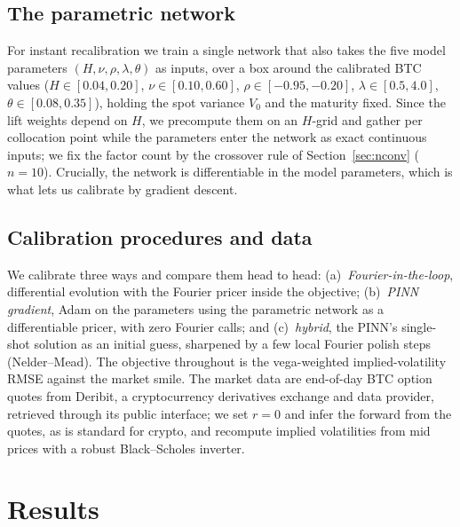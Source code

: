 \documentclass[11pt]{article}
\begin{document}
\subsection{The parametric network}
For instant recalibration we train a single network that also takes the five model
parameters $(H,\nu,\rho,\lambda,\theta)$ as inputs, over a box around the
calibrated BTC values ($H\in[0.04,0.20]$, $\nu\in[0.10,0.60]$,
$\rho\in[-0.95,-0.20]$, $\lambda\in[0.5,4.0]$, $\theta\in[0.08,0.35]$), holding the
spot variance $V_0$ and the maturity fixed. Since the lift weights depend on $H$,
we precompute them on an $H$-grid and gather per collocation point while the
parameters enter the network as exact continuous inputs; we fix the factor count
by the crossover rule of Section~\ref{sec:nconv} ($n=10$). Crucially, the network
is differentiable in the model parameters, which is what lets us calibrate by
gradient descent.

\subsection{Calibration procedures and data}
We calibrate three ways and compare them head to head: (a)~\emph{Fourier-in-the-loop},
differential evolution with the Fourier pricer inside the objective;
(b)~\emph{PINN gradient}, Adam on the parameters using the parametric network as a
differentiable pricer, with zero Fourier calls; and (c)~\emph{hybrid}, the PINN's
single-shot solution as an initial guess, sharpened by a few local Fourier polish
steps (Nelder--Mead). The objective throughout is the vega-weighted
implied-volatility RMSE against the market smile. The market data are end-of-day
BTC option quotes from Deribit, a cryptocurrency derivatives exchange and data
provider, retrieved through its public interface; we set $r=0$ and infer the
forward from the quotes, as is standard for crypto, and recompute implied
volatilities from mid prices with a robust Black--Scholes inverter.

\section{Results}
\end{document}
